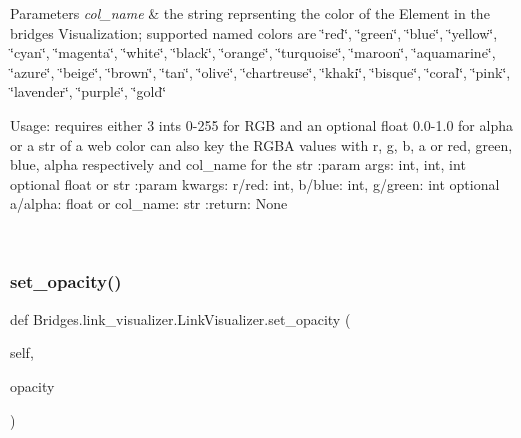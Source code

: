 \begin{DoxyParams}{Parameters}
{\em col\+\_\+name} & the string reprsenting the color of the Element in the bridges Visualization; supported named colors are \char`\"{}red\char`\"{}, \char`\"{}green\char`\"{}, \char`\"{}blue\char`\"{}, \char`\"{}yellow\char`\"{}, \char`\"{}cyan\char`\"{}, \char`\"{}magenta\char`\"{}, \char`\"{}white\char`\"{}, \char`\"{}black\char`\"{}, \char`\"{}orange\char`\"{}, \char`\"{}turquoise\char`\"{}, \char`\"{}maroon\char`\"{}, \char`\"{}aquamarine\char`\"{}, \char`\"{}azure\char`\"{}, \char`\"{}beige\char`\"{}, \char`\"{}brown\char`\"{}, \char`\"{}tan\char`\"{}, \char`\"{}olive\char`\"{}, \char`\"{}chartreuse\char`\"{}, \char`\"{}khaki\char`\"{}, \char`\"{}bisque\char`\"{}, \char`\"{}coral\char`\"{}, \char`\"{}pink\char`\"{}, \char`\"{}lavender\char`\"{}, \char`\"{}purple\char`\"{}, \char`\"{}gold\char`\"{}\begin{DoxyVerb}Usage: requires either 3 ints 0-255 for RGB and an optional float 0.0-1.0 for alpha or a str of a web color
can also key the RGBA values with r, g, b, a or red, green, blue, alpha respectively and col_name for the str
:param args: int, int, int optional float or str
:param kwargs: r/red: int, b/blue: int, g/green: int optional a/alpha: float or col_name: str
:return: None
\end{DoxyVerb}
 \\
\hline
\end{DoxyParams}
\mbox{\label{class_bridges_1_1link__visualizer_1_1_link_visualizer_a46cb7057831aba1a5cd25d49552629e5}} 
\subsubsection{\texorpdfstring{set\+\_\+opacity()}{set\_opacity()}}
{\footnotesize\ttfamily def Bridges.\+link\+\_\+visualizer.\+Link\+Visualizer.\+set\+\_\+opacity (\begin{DoxyParamCaption}\item[{}]{self,  }\item[{}]{opacity }\end{DoxyParamCaption})}



